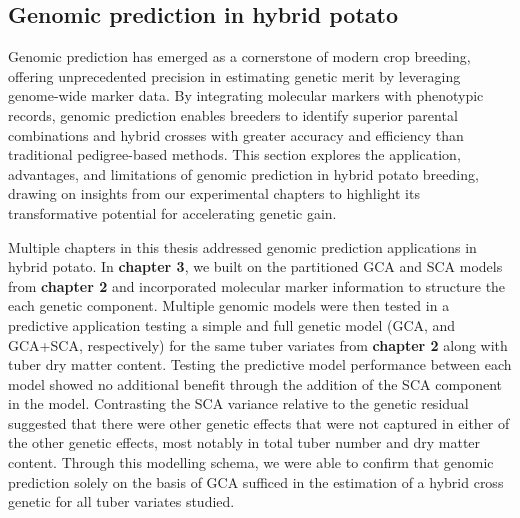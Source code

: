 \documentclass[
]{article}
\begin{document}
\subsection{Genomic prediction in hybrid
potato}\label{genomic-prediction-in-hybrid-potato}

Genomic prediction has emerged as a cornerstone of modern crop breeding,
offering unprecedented precision in estimating genetic merit by
leveraging genome-wide marker data. By integrating molecular markers
with phenotypic records, genomic prediction enables breeders to identify
superior parental combinations and hybrid crosses with greater accuracy
and efficiency than traditional pedigree-based methods. This section
explores the application, advantages, and limitations of genomic
prediction in hybrid potato breeding, drawing on insights from our
experimental chapters to highlight its transformative potential for
accelerating genetic gain.

Multiple chapters in this thesis addressed genomic prediction
applications in hybrid potato. In \textbf{chapter 3}, we built on the
partitioned GCA and SCA models from \textbf{chapter 2} and incorporated
molecular marker information to structure the each genetic component.
Multiple genomic models were then tested in a predictive application
testing a simple and full genetic model (GCA, and GCA+SCA, respectively)
for the same tuber variates from \textbf{chapter 2} along with tuber dry
matter content. Testing the predictive model performance between each
model showed no additional benefit through the addition of the SCA
component in the model. Contrasting the SCA variance relative to the
genetic residual suggested that there were other genetic effects that
were not captured in either of the other genetic effects, most notably
in total tuber number and dry matter content. Through this modelling
schema, we were able to confirm that genomic prediction solely on the
basis of GCA sufficed in the estimation of a hybrid cross genetic for
all tuber variates studied.
\end{document}
